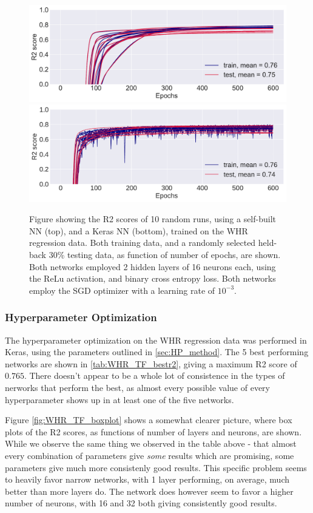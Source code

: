 \documentclass[10pt, twocolumn]{article}
\begin{document}
\begin{figure}[H]
    \centering
    \includegraphics[scale=0.38]{../figs/wh_r2_epochs_self.pdf}
    \includegraphics[scale=0.38]{../figs/CC_NN_TF_epochs.pdf}
    \caption{Figure showing the R2 scores of 10 random runs, using a self-built NN (top), and a Keras NN (bottom), trained on the WHR regression data. Both training data, and a randomly selected held-back 30\% testing data, as function of number of epochs, are shown. Both networks employed 2 hidden layers of 16 neurons each, using the ReLu activation, and binary cross entropy loss. Both networks employ the SGD optimizer with a learning rate of $10^{-3}$.}
    \label{fig:WHR_self_TF_comparison}
\end{figure}



\subsubsection{Hyperparameter Optimization}
The hyperparameter optimization on the WHR regression data was performed in Keras, using the parameters outlined in \cref{sec:HP_method}. The 5 best performing networks are shown in \cref{tab:WHR_TF_bestr2}, giving a maximum R2 score of $0.765$. There doesn't appear to be a whole lot of consistence in the types of nerworks that perform the best, as almost every possible value of every hyperparameter shows up in at least one of the five networks.

Figure \ref{fig:WHR_TF_boxplot} shows a somewhat clearer picture, where box plots of the R2 scores, as functions of number of layers and neurons, are shown. While we observe the same thing we observed in the table above - that almost every combination of parameters give \textit{some} results which are promising, some parameters give much more consistenly good results. This specific problem seems to heavily favor narrow networks, with 1 layer performing, on average, much better than more layers do. The network does however seem to favor a higher number of neurons, with 16 and 32 both giving consistently good results.
\end{document}
